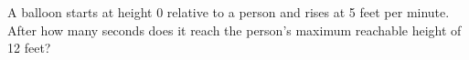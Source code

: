 A balloon starts at height 0 relative to a person and rises at 5 feet per minute. After how many seconds does it reach the person's maximum reachable height of 12 feet?
